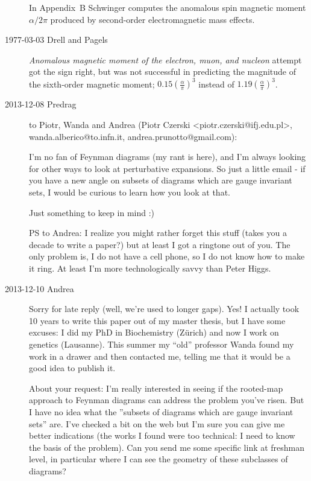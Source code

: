 \begin{description}
In Appendix~B Schwinger computes the anomalous spin magnetic
moment $\alpha/2\pi$ produced by second-order electromagnetic mass effects.

\item[1977-03-03 Drell and Pagels]
{\em Anomalous magnetic moment of the electron, muon, and nucleon}
attempt got the sign right, but was not successful in predicting the
magnitude of the sixth-order magnetic moment;
$0.15 \left(\frac{\alpha}{\pi}\right)^3$ instead of
$1.19 \left(\frac{\alpha}{\pi}\right)^3$.

\item[2013-12-08  Predrag] to Piotr, Wanda and Andrea
(Piotr Czerski <piotr.czerski@ifj.edu.pl>,
 wanda.alberico@to.infn.it,
 andrea.prunotto@gmail.com):

I'm no fan of Feynman diagrams (my rant is
{here}), and I'm always looking
for other ways to look at perturbative expansions. So just a little email
- if you have a new angle on subsets of diagrams which are gauge
invariant sets, I would be curious to learn how you look at that.

Just something to keep in mind :)

PS to Andrea: I realize you might rather forget this stuff (takes you a
decade to write a paper?) but at least I got a ringtone out of you. The
only problem is, I do not have a cell phone, so I do not know how to make
it ring. At least I'm more technologically savvy than
{Peter Higgs}.

\item[2013-12-10  \HREF{https://sites.google.com/site/andreaprunotto/} {Andrea}]
Sorry for late reply (well, we're used to longer gaps). Yes! I actually
took 10 years to write this paper out of my master thesis, but I have
some excuses: I did my PhD in Biochemistry (Z\"urich) and now I work on
genetics (Lausanne). This summer my ``old'' professor Wanda found my work
in a drawer and then contacted me, telling me that it would be a good
idea to publish it.

About your request: I'm really interested in seeing if the rooted-map
approach to Feynman diagrams can address the problem you've risen. But I
have no idea what the ''subsets of diagrams which are gauge invariant
sets'' are. I've checked a bit on the web but I'm sure you can give me
better indications (the works I found were too technical: I need to know
the basis of the problem). Can you send me some specific link at freshman
level, in particular where I can see the geometry of these subclasses of
diagrams?


\end{description}

